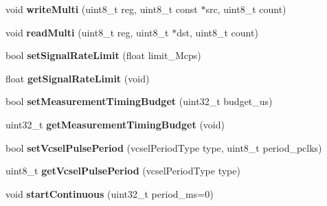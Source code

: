 \begin{DoxyCompactItemize}
\item 
void {\bfseries write\+Multi} (uint8\+\_\+t reg, uint8\+\_\+t const $\ast$src, uint8\+\_\+t count)\hypertarget{class_v_l53_l0_x_a22b4ca7c4e0562ddcb74cc939024deb2}{}\label{class_v_l53_l0_x_a22b4ca7c4e0562ddcb74cc939024deb2}

\item 
void {\bfseries read\+Multi} (uint8\+\_\+t reg, uint8\+\_\+t $\ast$dst, uint8\+\_\+t count)\hypertarget{class_v_l53_l0_x_a9decb4846fd2cc6d9c15b29ff2edc275}{}\label{class_v_l53_l0_x_a9decb4846fd2cc6d9c15b29ff2edc275}

\item 
bool {\bfseries set\+Signal\+Rate\+Limit} (float limit\+\_\+\+Mcps)\hypertarget{class_v_l53_l0_x_a32ea0f8c88d634abcf36850ced40e9eb}{}\label{class_v_l53_l0_x_a32ea0f8c88d634abcf36850ced40e9eb}

\item 
float {\bfseries get\+Signal\+Rate\+Limit} (void)\hypertarget{class_v_l53_l0_x_a5fdac59ab355cc57f27462823cc576d4}{}\label{class_v_l53_l0_x_a5fdac59ab355cc57f27462823cc576d4}

\item 
bool {\bfseries set\+Measurement\+Timing\+Budget} (uint32\+\_\+t budget\+\_\+us)\hypertarget{class_v_l53_l0_x_a74e836308c2062c7871a37fe11c026ca}{}\label{class_v_l53_l0_x_a74e836308c2062c7871a37fe11c026ca}

\item 
uint32\+\_\+t {\bfseries get\+Measurement\+Timing\+Budget} (void)\hypertarget{class_v_l53_l0_x_a9c9cb975a20876bae3d7716c698b72eb}{}\label{class_v_l53_l0_x_a9c9cb975a20876bae3d7716c698b72eb}

\item 
bool {\bfseries set\+Vcsel\+Pulse\+Period} (vcsel\+Period\+Type type, uint8\+\_\+t period\+\_\+pclks)\hypertarget{class_v_l53_l0_x_a2234b48a180b7eb630b7a82cfa4c3b44}{}\label{class_v_l53_l0_x_a2234b48a180b7eb630b7a82cfa4c3b44}

\item 
uint8\+\_\+t {\bfseries get\+Vcsel\+Pulse\+Period} (vcsel\+Period\+Type type)\hypertarget{class_v_l53_l0_x_a1a5b6c572a2be57ae5503ae81fea0f87}{}\label{class_v_l53_l0_x_a1a5b6c572a2be57ae5503ae81fea0f87}

\item 
void {\bfseries start\+Continuous} (uint32\+\_\+t period\+\_\+ms=0)\hypertarget{class_v_l53_l0_x_a502070924e6c6fa39a7a003bdf1c8663}{}\label{class_v_l53_l0_x_a502070924e6c6fa39a7a003bdf1c8663}


\end{DoxyCompactItemize}
